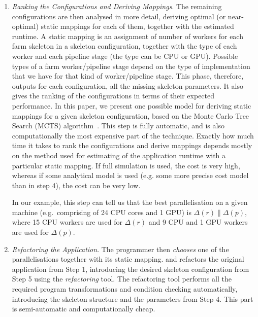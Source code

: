 \documentclass[smallextended]{svjour3}
\begin{document}
\begin{enumerate}
\item \emph{Ranking the Configurations and Deriving Mappings}. The remaining configurations are then analysed in more detail,
  deriving optimal (or near-optimal) static mappings for each of them,
  together with the estimated runtime. A static mapping is an
  assignment of number of workers for each farm skeleton in a skeleton
  configuration, together with the type of each worker and each
  pipeline stage (the type can be CPU
  or GPU). Possible types of a farm worker/pipeline stage depend on
  the type of implementation that we have for that kind of
  worker/pipeline stage. This phase, therefore, outputs
  for each configuration, all the missing skeleton parameters. It also 
  gives the ranking of the configurations
  in terms of their expected performance. In this paper, we present
  one possible model for deriving static mappings for a given skeleton
  configuration, based on the Monte Carlo Tree Search (MCTS)
  algorithm~\cite{mc}. This step is fully automatic, and is also
  computationally the most expensive part of the technique. Exactly
  how much time it takes to rank the configurations and derive
  mappings depends mostly on the method used for estimating of the
  application runtime with a particular static mapping. If full simulation is used,
  the cost is very high, whereas if some analytical model is used
  (e.g. some more precise cost model than in step 4), the cost can be
  very low.


%
  In our example, this step can tell us that the best parallelisation on a given
  machine (e.g.\ comprising of 24 CPU cores and 1 GPU) is
  $\Delta(r) \parallel \Delta(p)$, where 15 CPU workers are used for
  $\Delta(r)$ and 9 CPU and 1 GPU workers are used for
  $\Delta(p)$. 
\item \emph{Refactoring the Application}. The programmer then \emph{chooses} one of the parallelisations together with its static mapping.
and refactors the original application from Step 1, introducing the
desired skeleton configuration from Step 5 using the \emph{refactoring} tool.
The refactoring tool performs all the required program transformations and condition checking automatically,
introducing the skeleton structure and the parameters from Step
4. This part is semi-automatic and computationally cheap.


\end{enumerate}
\end{document}
